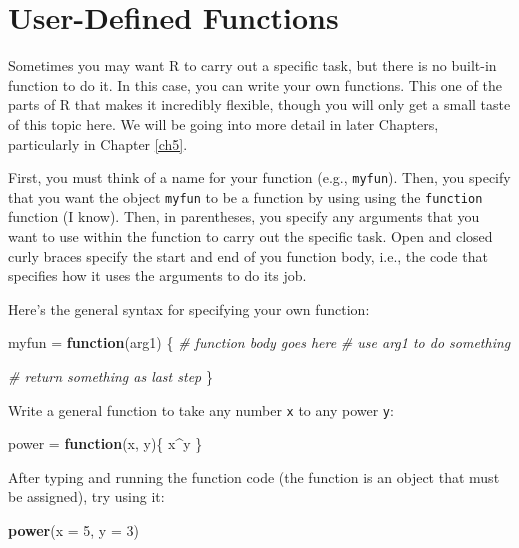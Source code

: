\documentclass[]{book}
\newenvironment{Shaded}{\begin{snugshade}}{\end{snugshade}}
\newcommand{\KeywordTok}[1]{\textcolor[rgb]{0.13,0.29,0.53}{\textbf{#1}}}
\newcommand{\DataTypeTok}[1]{\textcolor[rgb]{0.13,0.29,0.53}{#1}}
\newcommand{\DecValTok}[1]{\textcolor[rgb]{0.00,0.00,0.81}{#1}}
\newcommand{\StringTok}[1]{\textcolor[rgb]{0.31,0.60,0.02}{#1}}
\newcommand{\CommentTok}[1]{\textcolor[rgb]{0.56,0.35,0.01}{\textit{#1}}}
\newcommand{\ControlFlowTok}[1]{\textcolor[rgb]{0.13,0.29,0.53}{\textbf{#1}}}
\newcommand{\OperatorTok}[1]{\textcolor[rgb]{0.81,0.36,0.00}{\textbf{#1}}}
\newcommand{\NormalTok}[1]{#1}
\theoremstyle{definition}
\theoremstyle{definition}
\theoremstyle{definition}
\theoremstyle{remark}
\begin{document}
\section{User-Defined Functions}\label{user-defined-functions}

Sometimes you may want R to carry out a specific task, but there is no
built-in function to do it. In this case, you can write your own
functions. This one of the parts of R that makes it incredibly flexible,
though you will only get a small taste of this topic here. We will be
going into more detail in later Chapters, particularly in Chapter
\ref{ch5}.

First, you must think of a name for your function (e.g.,
\texttt{myfun}). Then, you specify that you want the object
\texttt{myfun} to be a function by using using the \texttt{function}
function (I know). Then, in parentheses, you specify any arguments that
you want to use within the function to carry out the specific task. Open
and closed curly braces specify the start and end of you function body,
i.e., the code that specifies how it uses the arguments to do its job.

Here's the general syntax for specifying your own function:

\begin{Shaded}
\begin{Highlighting}[]
\NormalTok{myfun =}\StringTok{ }\ControlFlowTok{function}\NormalTok{(arg1) \{}
  \CommentTok{# function body goes here}
  \CommentTok{# use arg1 to do something}
  
  \CommentTok{# return something as last step}
\NormalTok{\}}
\end{Highlighting}
\end{Shaded}

Write a general function to take any number \texttt{x} to any power
\texttt{y}:

\begin{Shaded}
\begin{Highlighting}[]
\NormalTok{power =}\StringTok{ }\ControlFlowTok{function}\NormalTok{(x, y)\{}
\NormalTok{  x}\OperatorTok{^}\NormalTok{y}
\NormalTok{\}}
\end{Highlighting}
\end{Shaded}

After typing and running the function code (the function is an object
that must be assigned), try using it:

\begin{Shaded}
\begin{Highlighting}[]
\KeywordTok{power}\NormalTok{(}\DataTypeTok{x =} \DecValTok{5}\NormalTok{, }\DataTypeTok{y =} \DecValTok{3}\NormalTok{)}
\end{Highlighting}
\end{Shaded}
\end{document}
